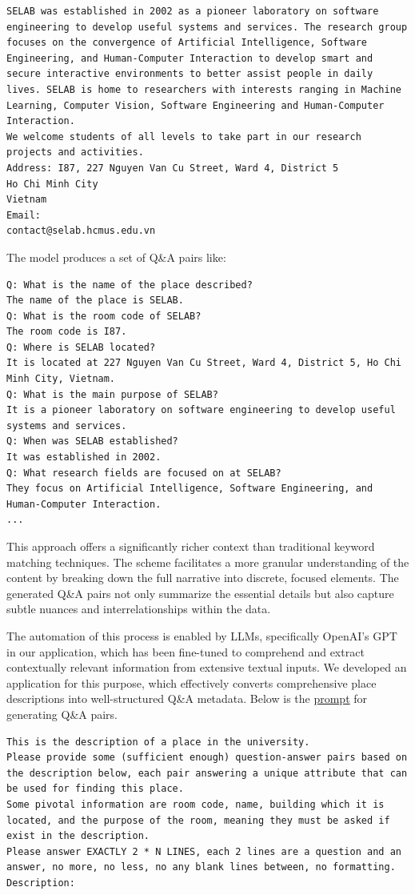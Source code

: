 \begin{lstlisting}[style=cSharp]
SELAB was established in 2002 as a pioneer laboratory on software engineering to develop useful systems and services. The research group focuses on the convergence of Artificial Intelligence, Software Engineering, and Human-Computer Interaction to develop smart and secure interactive environments to better assist people in daily lives. SELAB is home to researchers with interests ranging in Machine Learning, Computer Vision, Software Engineering and Human-Computer Interaction.
We welcome students of all levels to take part in our research projects and activities.
Address: I87, 227 Nguyen Van Cu Street, Ward 4, District 5
Ho Chi Minh City
Vietnam
Email:  
contact@selab.hcmus.edu.vn
\end{lstlisting}

The model produces a set of Q\&A pairs like:

\begin{lstlisting}[style=cSharp]
Q: What is the name of the place described?
The name of the place is SELAB.
Q: What is the room code of SELAB?
The room code is I87.
Q: Where is SELAB located?
It is located at 227 Nguyen Van Cu Street, Ward 4, District 5, Ho Chi Minh City, Vietnam.
Q: What is the main purpose of SELAB?
It is a pioneer laboratory on software engineering to develop useful systems and services.
Q: When was SELAB established?
It was established in 2002.
Q: What research fields are focused on at SELAB?
They focus on Artificial Intelligence, Software Engineering, and Human-Computer Interaction.
...
\end{lstlisting}

This approach offers a significantly richer context than traditional keyword matching techniques. The scheme facilitates a more granular understanding of the content by breaking down the full narrative into discrete, focused elements. The generated Q\&A pairs not only summarize the essential details but also capture subtle nuances and interrelationships within the data.

The automation of this process is enabled by LLMs, specifically OpenAI’s GPT in our application, which has been fine-tuned to comprehend and extract contextually relevant information from extensive textual inputs. We developed an application for this purpose, which effectively converts comprehensive place descriptions into well-structured Q\&A metadata. Below is the \hyperlink{prompt-engineering}{prompt} for generating Q\&A pairs.

\begin{lstlisting}[style=cSharp]
This is the description of a place in the university.
Please provide some (sufficient enough) question-answer pairs based on the description below, each pair answering a unique attribute that can be used for finding this place.
Some pivotal information are room code, name, building which it is located, and the purpose of the room, meaning they must be asked if exist in the description.
Please answer EXACTLY 2 * N LINES, each 2 lines are a question and an answer, no more, no less, no any blank lines between, no formatting.
Description: 
\end{lstlisting}

